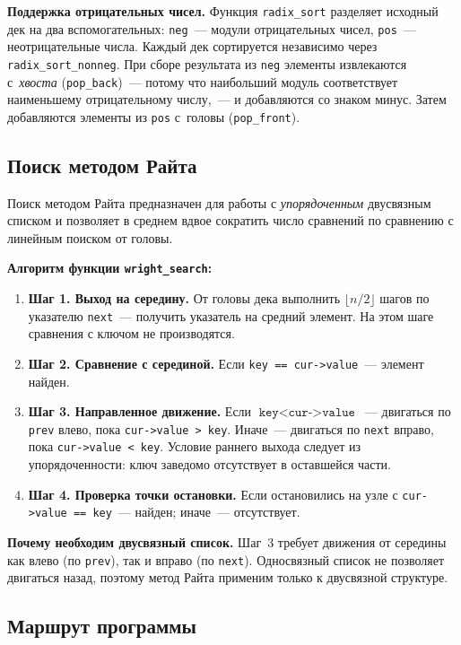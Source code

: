 \documentclass[a4paper,14pt]{extarticle}
\begin{document}
\textbf{Поддержка отрицательных чисел.} Функция \texttt{radix\_sort} разделяет исходный дек на два вспомогательных: \texttt{neg}~--- модули отрицательных чисел, \texttt{pos}~--- неотрицательные числа. Каждый дек сортируется независимо через \texttt{radix\_sort\_nonneg}. При сборе результата из \texttt{neg} элементы извлекаются с~\textit{хвоста} (\texttt{pop\_back})~--- потому что наибольший модуль соответствует наименьшему отрицательному числу,~--- и добавляются со знаком минус. Затем добавляются элементы из \texttt{pos} с~головы (\texttt{pop\_front}).

\subsection{Поиск методом Райта}

Поиск методом Райта предназначен для работы с \textit{упорядоченным} двусвязным списком и позволяет в среднем вдвое сократить число сравнений по сравнению с линейным поиском от головы.

\textbf{Алгоритм функции \texttt{wright\_search}:}

\begin{enumerate}
  \item \textbf{Шаг 1. Выход на середину.} От головы дека выполнить $\lfloor n/2 \rfloor$ шагов по указателю \texttt{next}~--- получить указатель на средний элемент. На этом шаге сравнения с ключом не производятся.
  \item \textbf{Шаг 2. Сравнение с серединой.} Если \texttt{key == cur->value}~--- элемент найден.
  \item \textbf{Шаг 3. Направленное движение.} Если $\texttt{key} < \texttt{cur->value}$~--- двигаться по \texttt{prev} влево, пока \texttt{cur->value > key}. Иначе~--- двигаться по \texttt{next} вправо, пока \texttt{cur->value < key}. Условие раннего выхода следует из упорядоченности: ключ заведомо отсутствует в оставшейся части.
  \item \textbf{Шаг 4. Проверка точки остановки.} Если остановились на узле с \texttt{cur->value == key}~--- найден; иначе~--- отсутствует.
\end{enumerate}

\textbf{Почему необходим двусвязный список.} Шаг~3 требует движения от середины как влево (по \texttt{prev}), так и вправо (по \texttt{next}). Односвязный список не позволяет двигаться назад, поэтому метод Райта применим только к двусвязной структуре.

\subsection{Маршрут программы}
\end{document}
